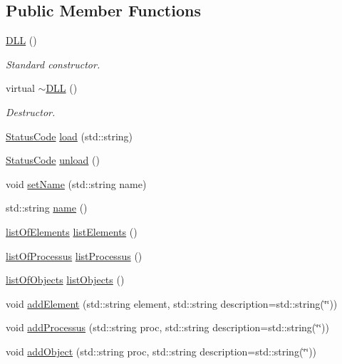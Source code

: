 \subsection*{Public Member Functions}
\begin{DoxyCompactItemize}
\item 
\hyperlink{classDLL_a78a22a98025697c4862ffc2a7cfcb648}{DLL} ()
\begin{DoxyCompactList}\small\item\em Standard constructor. \item\end{DoxyCompactList}\item 
virtual \hyperlink{classDLL_aff5b45d4b57b97144d4b49bc05aa0ddd}{$\sim$DLL} ()
\begin{DoxyCompactList}\small\item\em Destructor. \item\end{DoxyCompactList}\item 
\hyperlink{classStatusCode}{StatusCode} \hyperlink{classDLL_a64166d3479edf7e44fd539841e70fb3a}{load} (std::string)
\item 
\hyperlink{classStatusCode}{StatusCode} \hyperlink{classDLL_a10147aebd7b2688354f8c372d468d4aa}{unload} ()
\item 
void \hyperlink{classDLL_afc65a270b32a08d0681819cf2317aef0}{setName} (std::string name)
\item 
std::string \hyperlink{classDLL_a0a915d538771dde2cb0580cd340ee088}{name} ()
\item 
\hyperlink{classDLL_a36792635c3cd36adbaaef2ff7152046e}{listOfElements} \hyperlink{classDLL_adc96628c3ffd637827615fb5a3c71119}{listElements} ()
\item 
\hyperlink{classDLL_aded1b0bb41b288ed4f34cb6d6632d486}{listOfProcessus} \hyperlink{classDLL_a52eb21bf2ac1a61ae8ae41663ce4c3f8}{listProcessus} ()
\item 
\hyperlink{classDLL_a68629aa6f9103c5a3082511ff8218b1e}{listOfObjects} \hyperlink{classDLL_a3bde9f46fc00bcc1b0a22558cf0447da}{listObjects} ()
\item 
void \hyperlink{classDLL_ac6528d0e965139d0830868fe8cace775}{addElement} (std::string element, std::string description=std::string(\char`\"{}\char`\"{}))
\item 
void \hyperlink{classDLL_a1f08b909c1569631b6b6b84b52409e33}{addProcessus} (std::string proc, std::string description=std::string(\char`\"{}\char`\"{}))
\item 
void \hyperlink{classDLL_a76bd3e49e5e0046b017aa18afdc55a41}{addObject} (std::string proc, std::string description=std::string(\char`\"{}\char`\"{}))

\end{DoxyCompactItemize}

